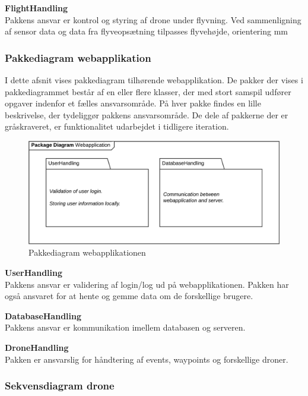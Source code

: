 \textbf{FlightHandling}\\
Pakkens ansvar er kontrol og styring af drone under flyvning. Ved sammenligning af sensor data og data fra flyveopsætning tilpasses flyvehøjde, orientering mm



\newpage
\subsubsection*{Pakkediagram webapplikation}

I dette afsnit vises pakkediagram tilhørende webapplikation. De pakker der vises i pakkediagrammet består af en eller flere klasser, der med stort samspil udfører opgaver indenfor et fælles ansvarsområde. På hver pakke findes en lille beskrivelse, der tydeliggør pakkens ansvarsområde. De dele af pakkerne der er gråskraveret, er funktionalitet udarbejdet i tidligere iteration.

\begin{figure}[H]
	\centering
	\includegraphics[width=1\textwidth]{Billeder/pakke_diagrammer/iteration1_server.png}
	\vspace{-0.5cm}
	\caption{Pakkediagram webapplikationen}
	\label{fig:iteration1_pakke_diagram_webapp}
\end{figure}

\textbf{UserHandling}\\
Pakkens ansvar er validering af login/log ud på webapplikationen. Pakken har også ansvaret for at hente og gemme data om de forskellige brugere.

\textbf{DatabaseHandling}\\
Pakkens ansvar er kommunikation imellem databasen og serveren. 

\textbf{DroneHandling}\\
Pakken er ansvarslig for håndtering af events, waypoints og forskellige droner.

\newpage

\subsubsection*{Sekvensdiagram drone}

